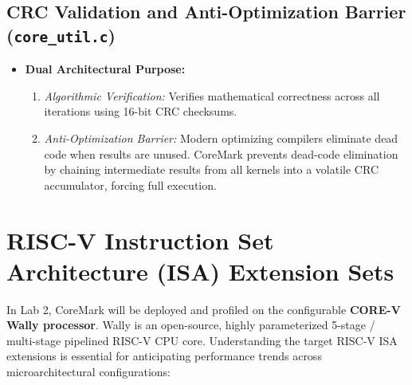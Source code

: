\documentclass[11pt,a4paper]{article}
\begin{document}
\subsection{CRC Validation and Anti-Optimization Barrier (\texttt{core\_util.c})}
\begin{itemize}[leftmargin=1.4em]
    \item \textbf{Dual Architectural Purpose:}
    \begin{enumerate}
        \item \textit{Algorithmic Verification:} Verifies mathematical correctness across all iterations using 16-bit CRC checksums.
        \item \textit{Anti-Optimization Barrier:} Modern optimizing compilers eliminate dead code when results are unused. CoreMark prevents dead-code elimination by chaining intermediate results from all kernels into a volatile CRC accumulator, forcing full execution.
    \end{enumerate}
\end{itemize}



\section{RISC-V Instruction Set Architecture (ISA) Extension Sets}
In Lab 2, CoreMark will be deployed and profiled on the configurable \textbf{CORE-V Wally processor}. Wally is an open-source, highly parameterized 5-stage / multi-stage pipelined RISC-V CPU core. Understanding the target RISC-V ISA extensions is essential for anticipating performance trends across microarchitectural configurations:
\end{document}
